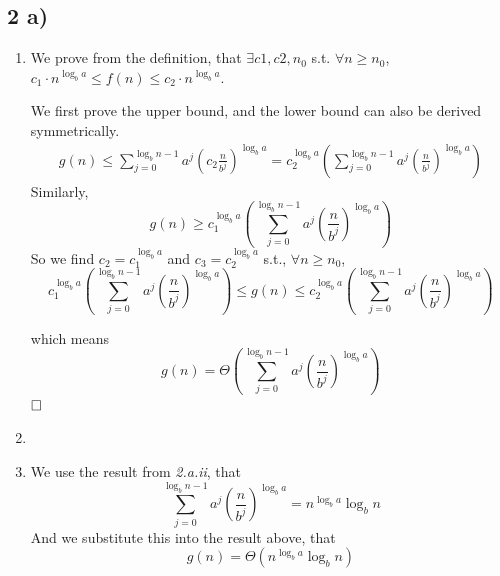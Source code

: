 \documentclass[A4paper]{article}
\newcommand{\qedhere}{$\hfill\ensuremath{\square}$}
\begin{document}
\subsection*{2 a)}
\begin{enumerate}

\item 
We prove from the definition, that $\exists c1, c2, n_0$ s.t. $\forall n \geq n_0$, $ c_1 \cdot n^{\log_ba} \leq f(n) \leq c_2 \cdot n^{\log_ba }$.
\par We first prove the upper bound, and the lower bound can also be derived symmetrically.
\[
	\begin{aligned}
	g(n) \leq \sum_{j=0}^{\log_bn-1} a^j (c_2\frac{n}{b^j})^{\log_ba} = c_2^{\log_ba} \left(\sum_{j=0}^{\log_bn-1} a^j (\frac{n}{b^j})^{\log_ba}\right)
	\end{aligned}
\]
Similarly, 
\[
	g(n) \geq c_1^{\log_ba} \left(\sum_{j=0}^{\log_bn-1} a^j (\frac{n}{b^j})^{\log_ba}\right)
\]
So we find $c_2 = c_1^{\log_ba}$ and $c_3 = c_2^{\log_ba}$ s.t., $\forall n \geq n_0$, $$c_1^{\log_ba} \left(\sum_{j=0}^{\log_bn-1} a^j (\frac{n}{b^j})^{\log_ba}\right) \leq g(n) \leq c_2^{\log_ba} \left(\sum_{j=0}^{\log_bn-1} a^j (\frac{n}{b^j})^{\log_ba}\right)$$

which means 
\[
	g(n) = \Theta(\sum_{j=0}^{\log_bn-1} a^j (\frac{n}{b^j})^{\log_ba})
\]
\qedhere

\item 
\item 
We use the result from \textit{2.a.ii}, that \[
	\sum_{j=0}^{\log_bn-1} a^j (\frac{n}{b^j})^{\log_ba} = n^{\log_ba} \log_bn
\]
And we substitute this into the result above, that 
\[
	g(n) = \Theta(n^{\log_ba} \log_bn)
\]
\end{enumerate}	
\newpage
\end{document}
